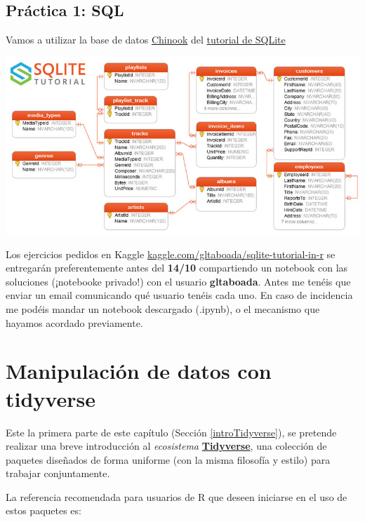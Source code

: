 \documentclass[
]{book}
\begin{document}
\hypertarget{pruxe1ctica-1-sql}{%
\section{Práctica 1: SQL}\label{pruxe1ctica-1-sql}}

Vamos a utilizar la base de datos \href{https://www.sqlitetutorial.net/wp-content/uploads/2018/03/chinook.zip}{Chinook} del \href{https://www.sqlitetutorial.net/sqlite-sample-database/}{tutorial de SQLite}

\includegraphics[width=6.25in,height=\textheight]{images/sqlite-sample-database-color.jpg}

Los ejercicios pedidos en Kaggle \href{https://www.kaggle.com/gltaboada/sqlite-tutorial-in-r}{kaggle.com/gltaboada/sqlite-tutorial-in-r} se entregarán preferentemente antes del \textbf{14/10} compartiendo un notebook con las soluciones (¡notebooke privado!) con el usuario \textbf{gltaboada}. Antes me tenéis que enviar un email comunicando qué usuario tenéis cada uno. En caso de incidencia me podéis mandar un notebook descargado (.ipynb), o el mecanismo que hayamos acordado previamente.

\hypertarget{tidyverse}{%
\chapter{Manipulación de datos con tidyverse}\label{tidyverse}}

Este la primera parte de este capítulo (Sección \ref{introTidyverse}), se pretende realizar una breve introducción al \emph{ecosistema} \href{https://dplyr.tidyverse.org}{\textbf{Tidyverse}}, una colección de paquetes diseñados de forma uniforme (con la misma filosofía y estilo) para trabajar conjuntamente.

La referencia recomendada para usuarios de R que deseen iniciarse en el uso de estos paquetes es:
\end{document}
